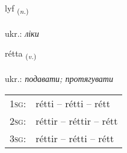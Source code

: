 \documentclass[frontgrid, backgrid]{flacards}\usepackage[]{graphicx}\usepackage[]{xcolor}
\begin{document}
\renewcommand{\flhead}{\vskip5pt \fboxsep=0pt {\small\bfseries\footnotesize Nafnorð | іменник}}
\renewcommand{\fcfoot}{\vskip5pt \fboxsep=0pt \hspace{2pt}{\small\bfseries\footnotesize 2K}}

\renewcommand{\blhead}{\vskip5pt {\small\bfseries\footnotesize Nafnorð | іменник }}
\renewcommand{\bcfoot}{\vskip5pt \hspace{2pt}{\small\bfseries\footnotesize 2K}}


{lyf \small{\textsubscript{(\textit{n.})}} \\[1ex] %
\textphonetic{[lɪːv]} \\
ukr.: \emph{ліки} \\  [2ex]
\renewcommand*{\arraystretch}{0.8}
}

\renewcommand{\flhead}{\vskip5pt \fboxsep=0pt {\small\bfseries\footnotesize Sagnorð | дієслово}}
\renewcommand{\fcfoot}{\vskip5pt \fboxsep=0pt \hspace{2pt}{\small\bfseries\footnotesize 2K}}

\renewcommand{\blhead}{\vskip5pt {\small\bfseries\footnotesize Sagnorð | дієслово }}
\renewcommand{\bcfoot}{\vskip5pt \hspace{2pt}{\small\bfseries\footnotesize 2K}}


{rétta \small{\textsubscript{(\textit{v.})}} \\[1ex] %
\textphonetic{[rjɛhta]} \\
ukr.: \emph{подавати; протягувати} \\  [2ex]
\renewcommand*{\arraystretch}{0.8}
\begin{tabular}{p{1cm}l}
\textsc{1sg}: & rétti -- rétti -- rétt \\ 
\textsc{2sg}: & réttir -- réttir -- rétt \\ 
\textsc{3sg}: & réttir -- rétti -- rétt \\ 
\end{tabular}
}
\end{document}
